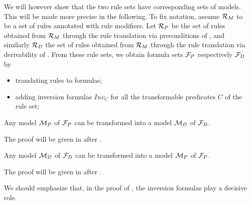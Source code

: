 We will however show that the two rule sets have corresponding sets of
models. This will be made more precise in the following. To fix notation,
assume ${\cal R}_M$ to be a set of rules annotated with rule modifiers. Let
${\cal R}_P$ be the set of rules obtained from ${\cal R}_M$ through the rule
translation via preconditions of , and similarly
${\cal R}_D$ the set of rules obtained from ${\cal R}_M$ through the rule
translation via derivability of . From these rule
sets, we obtain formula sets ${\cal F}_P$ respectively ${\cal F}_D$ by
\begin{itemize}
\item translating rules to formulas;
\item adding inversion formulas $Inv_C$ for all
  the transformable predicates $C$ of the rule set;
\end{itemize}


\begin{lemma}\label{lemma:mp_to_md}
  Any model ${\cal M}_P$ of ${\cal F}_P$ can be transformed into a model
  ${\cal M}_D$ of ${\cal F}_D$.
\end{lemma}

The proof will be given in  after .


\begin{lemma}\label{lemma:md_to_mp}
  Any model ${\cal M}_D$ of ${\cal F}_D$ can be transformed into a model
  ${\cal M}_P$ of ${\cal F}_P$.
\end{lemma}

The proof will be given in  after .

We should emphasize that, in the proof of , the
inversion formulas play a decisive role.


